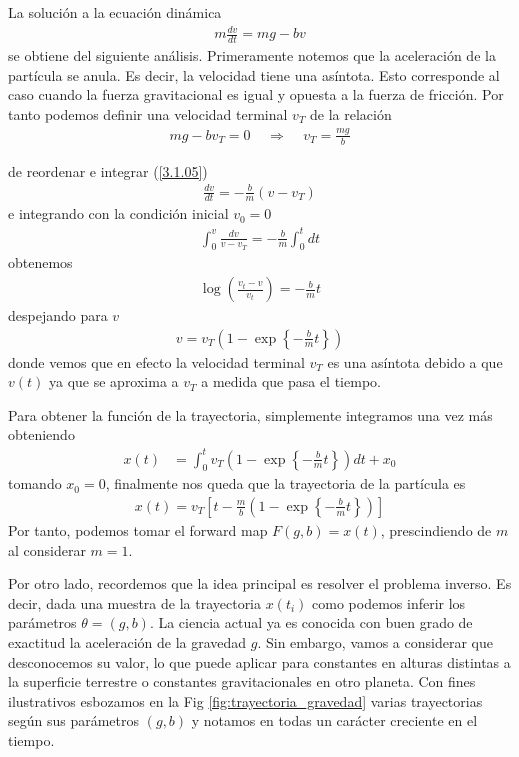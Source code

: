 La solución a la ecuación dinámica
\begin{align}
    m \frac{dv}{dt} = mg - bv
    \label{3.1.05}
\end{align}
se obtiene del siguiente análisis. Primeramente notemos que la aceleración de la partícula se anula. Es decir, la velocidad tiene una asíntota. Esto corresponde al caso cuando la fuerza gravitacional es igual y opuesta a la fuerza de fricción. Por tanto podemos definir una velocidad terminal $v_T$ de la relación
\begin{align}
    mg - bv_T = 0 \:\:\:\:\: \Rightarrow \:\:\:\:\: v_T = \frac{mg}{b}
    \label{3.1.06}
\end{align}

de reordenar e integrar (\ref{3.1.05}) 
\begin{align}
    \frac{dv}{dt } = -\frac{b}{m}(v - v_T)
    \label{3.1.07}
\end{align}
e integrando con la condición inicial $v_0 = 0$
\begin{align*}
    \int_{0}^{v} \frac{dv}{v - v_T} = -\frac{b}{m} \int_{0}^{t} dt
\end{align*}
obtenemos
\begin{align*}
    \log{\left ( \frac{v_t - v }{v_t} \right )} = -\frac{b}{m}t
\end{align*}
despejando para $v$ 
\begin{align}
    v = v_T \left ( 1- \exp \left \{{-\frac{b}{m}t} \right\} \right ) 
\end{align}
donde vemos que en efecto la velocidad terminal $v_T$ es una asíntota debido a que  $v(t)$ ya que se aproxima a $v_T$ a medida que pasa el tiempo. 

Para obtener la función de la trayectoria, simplemente integramos una vez más obteniendo
\begin{align*}
    x(t) &= \int_{0}^{t} v_T \left ( 1 - \exp \left \{-\frac{b}{m}t \right \} \right ) d t + x_0
\end{align*}
tomando $x_0 = 0$, finalmente nos queda que la trayectoria de la partícula es
\begin{align}
    x(t) = v_T \left [ t - \frac{m}{b} \left( 1- \exp\left\{-\frac{b}{m} t\right\}\right)\right]
    \label{3.1.12}
\end{align}
Por tanto, podemos tomar el forward map $F(g,b) = x(t)$, prescindiendo de $m$ al considerar $m = 1$.

Por otro lado, recordemos que la idea principal es resolver el problema inverso. Es decir, dada una muestra de la trayectoria $x(t_i)$ como podemos inferir los parámetros $\theta = (g,b)$. La ciencia actual ya es conocida con buen grado de exactitud la aceleración de la gravedad $g$. Sin embargo, vamos a considerar que desconocemos su valor, lo que puede aplicar para constantes en alturas distintas a la superficie terrestre o constantes gravitacionales en otro planeta. Con fines ilustrativos esbozamos en la Fig \ref{fig:trayectoria_gravedad} varias trayectorias según sus parámetros $(g,b)$ y notamos en todas un carácter creciente en el tiempo.

